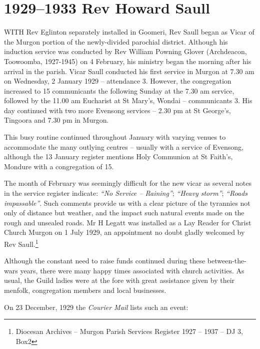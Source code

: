 \printendnotes[custom]
\setcounter{endnote}{0}
\chapter{1929--1933 Rev Howard Saull}
\nobalance


\lettrine[lines=3]{W}{ITH}
 Rev Eglinton separately installed in Goomeri, Rev Saull began as Vicar of the Murgon portion of the newly-divided parochial district. Although his induction service was conducted by Rev William Powning Glover (Archdeacon, Toowoomba, 1927-1945) on 4 February, his ministry began the morning after his arrival in the parish. Vicar Saull conducted his first service in Murgon at 7.30 am on Wednesday, 2 January 1929 -- attendance 3. However, the congregation increased to 15 communicants the following Sunday at the 7.30 am service, followed by the 11.00 am Eucharist at St Mary's, Wondai -- communicants 3. His day continued with two more Evensong services -- 2.30 pm at St George's, Tingoora and 7.30 pm in Murgon.

This busy routine continued throughout January with varying venues to accommodate the many outlying centres -- usually with a service of Evensong, although the 13 January register mentions Holy Communion at St Faith's, Mondure with a congregation of 15.



The month of February was seemingly difficult for the new vicar as several notes in the service register indicate: \emph{``No Service -- Raining''}; \emph{``Heavy storm''}; \emph{``Roads impassable''}. Such comments provide us with a clear picture of the tyrannies not only of distance but weather, and the impact such natural events made on the rough and unsealed roads. Mr H Legatt was installed as a Lay Reader for Christ Church Murgon on 1 July 1929, an appointment no doubt gladly welcomed by Rev Saull.\footnote{Diocesan Archives -- Murgon Parish Services Register 1927 -- 1937 -- DJ 3, Box2}


Although the constant need to raise funds continued during these between-the-wars years, there were many happy times associated with church activities. As usual, the Guild ladies were at the fore with great assistance given by their menfolk, congregation members and local businesses.



On 23 December, 1929 the \emph{Courier Mail} lists such an event:



